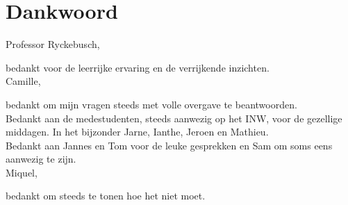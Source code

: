 \documentclass[11pt,twoside]{book}
\begin{document}
\thispagestyle{empty}
\chapter*{Dankwoord}

Professor Ryckebusch,

bedankt voor de leerrijke ervaring en de verrijkende inzichten.
\\

Camille,

bedankt om mijn vragen steeds met volle overgave te beantwoorden.
\\

Bedankt aan de medestudenten, steeds aanwezig op het INW, voor de gezellige middagen. In het bijzonder Jarne, Ianthe, Jeroen en Mathieu.
\\

Bedankt aan Jannes en Tom voor de leuke gesprekken en Sam om soms eens aanwezig te zijn.
\\

Miquel,

bedankt om steeds te tonen hoe het niet moet.


\newpage

\tableofcontents

\newpage

\end{document}

